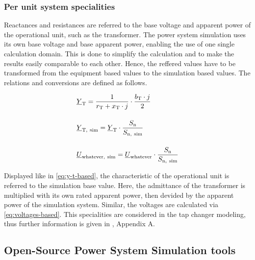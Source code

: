 \subsubsection*{Per unit system specialities}

Reactances and resistances are referred to the base voltage and apparent power of the operational unit, such as the transformer. The power system simulation uses its own base voltage and base apparent power, enabling the use of one single calculation domain. This is done to simplify the calculation and to make the results easily comparable to each other. Hence, the reffered values have to be transformed from the equipment based values to the simulation based values. The relations and conversions are defined as follows.

\begin{align}
    &\underline{Y}_\mathrm{T}=\frac{1}{r_\mathrm{T} + x_\mathrm{T} \cdot j} \cdot \frac{b_\mathrm{T} \cdot j}{2} \notag \\[12pt]
    &\underline{Y}_\mathrm{T,~sim}=\underline{Y}_\mathrm{T} \cdot \frac{S_\mathrm{n}}{S_\mathrm{n,~sim}} \label{eq:y-t-based} \\[12pt]
    &\underline{U}_\mathrm{whatever,~sim}=\underline{U}_\mathrm{whatever} \cdot \frac{S_\mathrm{n}}{S_\mathrm{n,~sim}} \label{eq:voltages-based}
\end{align}

Displayed like in \autoref{eq:y-t-based}, the characteristic of the operational unit is referred to the simulation base value. Here, the admittance of the transformer is multiplied with its own rated apparent power, then devided by the apparent power of the simulation system. Similar, the voltages are calculated via \autoref{eq:voltages-based}. This specialities are considered in the tap changer modeling, thus further information is given in \autocite{machowskiPowerSystemDynamics2020}, Appendix A.


\subsection{Open-Source Power System Simulation tools}
    

